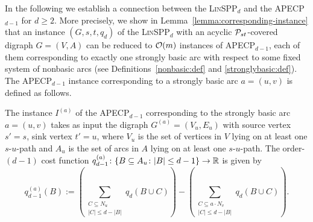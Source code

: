 In the following we establish a connection between the \textsc{Lin}SPP$_d$ and the APECP$_{d-1}$ for $d\ge 2$. More precisely, we show in Lemma~\ref{lemma:corresponding-instance}  that    an   instance $(G,s,t,q_d)$ of the  \textsc{Lin}SPP$_d$ with an acyclic  $\mathcal{P}_{st}$-covered digraph $G=(V,A)$ can  be reduced  to $\mathcal{O}(m)$ instances of APECP$_{d-1}$, each of them corresponding to exactly one strongly basic arc with respect to some fixed system of nonbasic arcs (see Definitions~\ref{nonbasic:def} and \ref{stronglybasic:def}).  The  APECP$_{d-1}$ instance corresponding to a strongly basic arc  $a = (u, v)$ is defined as follows.
\begin{definition}
\label{def:corresponding-instance}
  The instance $I^{(a)}$ of the APECP$_{d-1}$ corresponding to the strongly basic arc $a=(u,v)$ takes as input   the digraph $G^{(a)} = (V_u, E_u)$ with  source vertex $s' = s$,  sink vertex $t' = u$, where 
 $V_u$ is the set of vertices in $V$ lying on at least one $s$-$u$-path and $A_u$  is the set of arcs in $A$ lying on at least one $s$-$u$-path.
  The  order-$(d-1)$  cost function   $q_{d-1}^{(a)}\colon \{ B \subseteq A_u\colon  |B| \leq d-1\} \to \mathbb{R}$ is given by
    \begin{equation} \label{eq:definition_q_e}
        q_{d-1}^{(a)}(B) := \left(\sum_{\substack{C \subseteq N_u\\ |C| \leq d - |B|}}q_d(B \cup C) \right) - \left( \sum_{\substack{C \subseteq a \cdot N_v\\ |C| \leq d - |B|}}q_d(B \cup C) \right). 
    \end{equation}
\end{definition}


